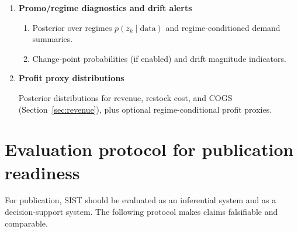 \documentclass[11pt]{article}
\begin{document}
\begin{enumerate}
  Expected demand during lead time:
  \[
    E[D^{\mathrm{LT}}_i] \approx E[d_i]\,E[L_i].
  \]

  Reorder point:
  \[
    \text{ROP}_i \equiv E[D^{\mathrm{LT}}_i] + \text{SS}_i.
  \]

  A fully Bayesian alternative (recommended) is to set:
  \[
    \text{ROP}_i = Q_{\beta}\bigl(D^{\mathrm{LT}}_i\bigr),
  \]
  where $Q_{\beta}$ is the posterior quantile computed directly from draws of $d_i$ and $L_i$.

  Reorder trigger probability at report $k$:
  \[
    P\bigl(x_{k,i} \le \text{ROP}_i\mid\text{data}\bigr).
  \]

  \item \textbf{Promo/regime diagnostics and drift alerts}
  \begin{enumerate}
    \item Posterior over regimes $p(z_k\mid\text{data})$ and regime-conditioned demand summaries.
    \item Change-point probabilities (if enabled) and drift magnitude indicators.
  \end{enumerate}

  \item \textbf{Profit proxy distributions}

  Posterior distributions for revenue, restock cost, and COGS (Section~\ref{sec:revenue}), plus optional regime-conditional profit proxies.
\end{enumerate}

\section{Evaluation protocol for publication readiness}

For publication, SIST should be evaluated as an inferential system and as a decision-support system. The following protocol makes claims falsifiable and comparable.
\end{document}
